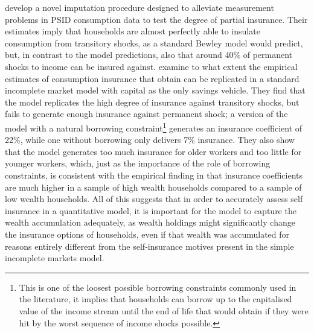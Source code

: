 \citet{BlundellPistaferriPreston2008} develop a novel imputation procedure 
designed to alleviate measurement problems in PSID consumption data to test the
degree of partial insurance. Their estimates imply that households are almost
perfectly able to insulate consumption from transitory shocks, as a standard
Bewley model would predict, but, in contrast to the model predictions, also that
around 40\% of permanent shocks to income can be insured against. 
\citet{KaplanViolante2010} examine to what extent the empirical estimates
of consumption insurance that \citet{BlundellPistaferriPreston2008} obtain can
be replicated in a standard incomplete market model with capital as the only 
savings vehicle. They find that the model replicates the high degree of insurance
against transitory shocks, but fails to generate enough insurance against permanent
shock; a version of the model with a natural borrowing constraint\footnote{This
is one of the loosest possible borrowing constraints commonly used in the literature,
it implies that households can borrow up to the capitalised value of the income
stream until the end of life that would obtain if they were hit by the worst 
sequence of income shocks possible.} generates an insurance coefficient of 22\%, 
while one without borrowing only delivers 7\% insurance. They also show that the model generates
too much insurance for older workers and too little for younger workers, which, 
just as the importance of the role of borrowing constraints, is consistent with
the empirical finding in \citet{BlundellPistaferriPreston2008} that insurance
coefficients are much higher in a sample of high wealth households compared to 
a sample of low wealth households. All of this suggests that in order to accurately
assess self insurance in a quantitative model, it is important for the model to
capture the wealth accumulation adequately, as wealth holdings might significantly
change the insurance options of households, even if that wealth was accumulated
for reasons entirely different from the self-insurance motives present in the 
simple incomplete markets model.

